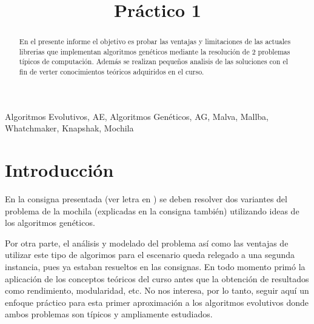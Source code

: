 \documentclass[9pt,conference]{IEEEtran}
\begin{document}
	\title{Pr\'actico 1}
	\author{
		\and
	}



	\maketitle

	\begin{abstract}
	En el presente informe el objetivo es probar las ventajas y limitaciones de las actuales librerias que implementan algoritmos gen\'eticos mediante la resoluci\'on de 2 problemas t\'ipicos de computaci\'on. Adem\'as se realizan pequeños analisis de las soluciones con el fin de verter conocimientos te\'oricos adquiridos en el curso.
	\end{abstract}
	\begin{IEEEkeywords}
	Algoritmos Evolutivos, AE, Algoritmos Gen\'eticos, AG, Malva, Mallba, Whatchmaker, Knapshak, Mochila
	\end{IEEEkeywords}

	\section{Introducci\'on}
	En la consigna presentada (ver letra en \cite{refmallba}) se deben resolver dos variantes del problema de la mochila (explicadas en la consigna tambi\'en) utilizando ideas de los algoritmos gen\'eticos.

	Por otra parte, el an\'alisis y modelado del problema as\'i como las ventajas de utilizar este tipo de algorimos para el escenario queda relegado a una segunda instancia, pues ya estaban resueltos en las consignas. En todo momento prim\'o la aplicaci\'on de los conceptos te\'oricos del curso antes que la obtenci\'on de resultados como rendimiento, modularidad, etc. No nos interesa, por lo tanto, seguir aqu\'i un enfoque pr\'actico para esta primer aproximaci\'on a los algoritmos evolutivos donde ambos problemas son t\'ipicos y ampliamente estudiados.
\end{document}
